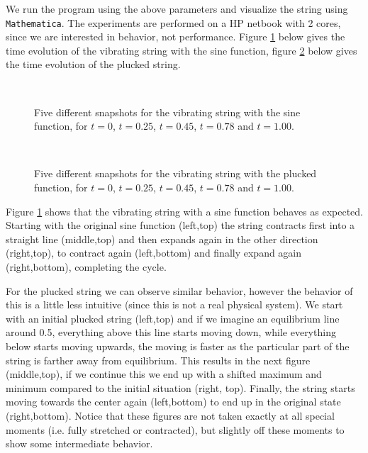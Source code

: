 \documentclass[11pt,a4paper,onecolumn]{article}
\begin{document}
We run the program using the above parameters and visualize the string using \texttt{Mathematica}. The experiments are performed on a HP netbook with 2 cores, since we are interested in behavior, not performance. Figure \ref{fig:sine} below gives the time evolution of the vibrating string with the sine function, figure \ref{fig:plucked} below gives the time evolution of the plucked string.

\begin{figure}[H]
  \centering
  \\
  \caption{Five different snapshots for the vibrating string with the sine function, for $t = 0$, $t = 0.25$, $t = 0.45$, $t = 0.78$ and $t = 1.00$.}
  \label{fig:sine}
\end{figure}

\begin{figure}[H]
  \centering
  \\
  \caption{Five different snapshots for the vibrating string with the plucked function, for $t = 0$, $t = 0.25$, $t = 0.45$, $t = 0.78$ and $t = 1.00$.}
  \label{fig:plucked}
\end{figure}

Figure \ref{fig:sine} shows that the vibrating string with a sine function behaves as expected. Starting with the original sine function (left,top) the string contracts first into a straight line (middle,top) and then expands again in the other direction (right,top), to contract again (left,bottom) and finally expand again (right,bottom), completing the cycle.

For the plucked string we can observe similar behavior, however the behavior of this is a little less intuitive (since this is not a real physical system). We start with an initial plucked string (left,top) and if we imagine an equilibrium line around 0.5, everything above this line starts moving down, while everything below starts moving upwards, the moving is faster as the particular part of the string is farther away from equilibrium. This results in the next figure (middle,top), if we continue this we end up with a shifted maximum and minimum compared to the initial situation (right, top). Finally, the string starts moving towards the center again (left,bottom) to end up in the original state (right,bottom). Notice that these figures are not taken exactly at all special moments (i.e. fully stretched or contracted), but slightly off these moments to show some intermediate behavior.
\end{document}
